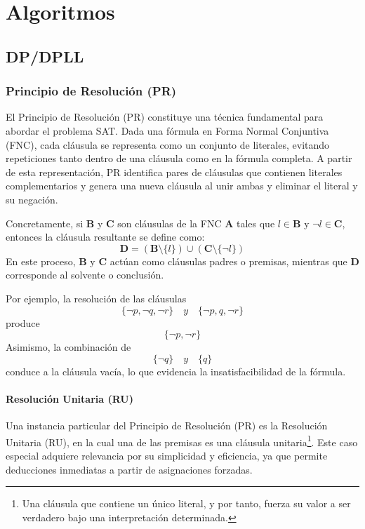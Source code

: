 \chapter{Algoritmos}
\label{chapter:algorithms}

\section{DP/DPLL}

\subsection{Principio de Resolución (PR)}
El Principio de Resolución (PR) constituye una técnica fundamental para abordar el problema SAT. Dada una fórmula en Forma Normal Conjuntiva (FNC), cada cláusula se representa como un conjunto de literales, evitando repeticiones tanto dentro de una cláusula como en la fórmula completa. A partir de esta representación, PR identifica pares de cláusulas que contienen literales complementarios y genera una nueva cláusula al unir ambas y eliminar el literal y su negación.

Concretamente, si \(\mathbf{B}\) y \(\mathbf{C}\) son cláusulas de la FNC \(\mathbf{A}\) tales que \(l\in\mathbf{B}\) y \(\neg l\in\mathbf{C}\), entonces la cláusula resultante se define como:
\[
\mathbf{D}=(\mathbf{B}\setminus\{l\})\cup(\mathbf{C}\setminus\{\neg l\})
\]
En este proceso, \(\mathbf{B}\) y \(\mathbf{C}\) actúan como cláusulas padres o premisas, mientras que \(\mathbf{D}\) corresponde al solvente o conclusión.

Por ejemplo, la resolución de las cláusulas
\[
\{\neg p,\neg q,\neg r\}\quad y\quad\{\neg p,q,\neg r\}
\]
produce
\[
\{\neg p,\neg r\}
\]
Asimismo, la combinación de
\[
\{\neg q\}\quad y\quad\{q\}
\]
conduce a la cláusula vacía, lo que evidencia la insatisfacibilidad de la fórmula.


\subsubsection{Resoluci\'on Unitaria (RU)}
Una instancia particular del Principio de Resoluci\'on (PR) es la Resoluci\'on Unitaria (RU), en la cual una de las premisas es una cl\'ausula unitaria\footnote{Una cl\'ausula que contiene un \'unico literal, y por tanto, fuerza su valor a ser verdadero bajo una interpretaci\'on determinada.}. Este caso especial adquiere relevancia por su simplicidad y eficiencia, ya que permite deducciones inmediatas a partir de asignaciones forzadas.


